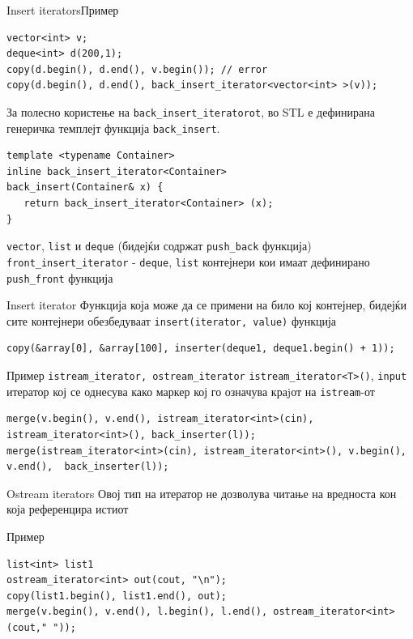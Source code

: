 \begin{frame}[fragile]{Insert iterators}{Пример}
\begin{lstlisting}
vector<int> v;
deque<int> d(200,1);
copy(d.begin(), d.end(), v.begin()); // error
copy(d.begin(), d.end(), back_insert_iterator<vector<int> >(v));
\end{lstlisting}
За полесно користење на \texttt{back\_insert\_iteratorot}, во STL е дефинирана
генеричка темплејт функција \texttt{back\_insert}. 
\begin{lstlisting}
template <typename Container>
inline back_insert_iterator<Container> 
back_insert(Container& x) {
   return back_insert_iterator<Container> (x);
}
\end{lstlisting}
\texttt{vector}, \texttt{list} и \texttt{deque} (бидејќи содржат \texttt{push\_back} функција)
\texttt{front\_insert\_iterator} - \texttt{deque}, \texttt{list} контејнери кои
имаат дефинирано \texttt{push\_front} функција
\end{frame}

\begin{frame}[fragile]{Insert iterator}
Функција која може да се примени на било кој контејнер, бидејќи сите контејнери
обезбедуваат \texttt{insert(iterator, value)} функција 
\begin{lstlisting}
copy(&array[0], &array[100], inserter(deque1, deque1.begin() + 1));
\end{lstlisting}
\begin{block}{Пример \texttt{istream\_iterator, ostream\_iterator}}
\texttt{istream\_iterator<T>()}, \texttt{input} итератор кој се однесува како
маркер кој го означува краjот на \texttt{istream}-от
\begin{lstlisting}
merge(v.begin(), v.end(), istream_iterator<int>(cin), istream_iterator<int>(), back_inserter(l));
merge(istream_iterator<int>(cin), istream_iterator<int>(), v.begin(), v.end(),  back_inserter(l));
\end{lstlisting}
\end{block}
\end{frame}

\begin{frame}[fragile]{Ostream iterators}
Овој тип на итератор не дозволува читање на вредноста кон која референцира истиот
\begin{block}{Пример}
\begin{lstlisting}
list<int> list1
ostream_iterator<int> out(cout, "\n");
copy(list1.begin(), list1.end(), out);
merge(v.begin(), v.end(), l.begin(), l.end(), ostream_iterator<int>(cout," "));
\end{lstlisting}
\end{block}

\end{frame}

